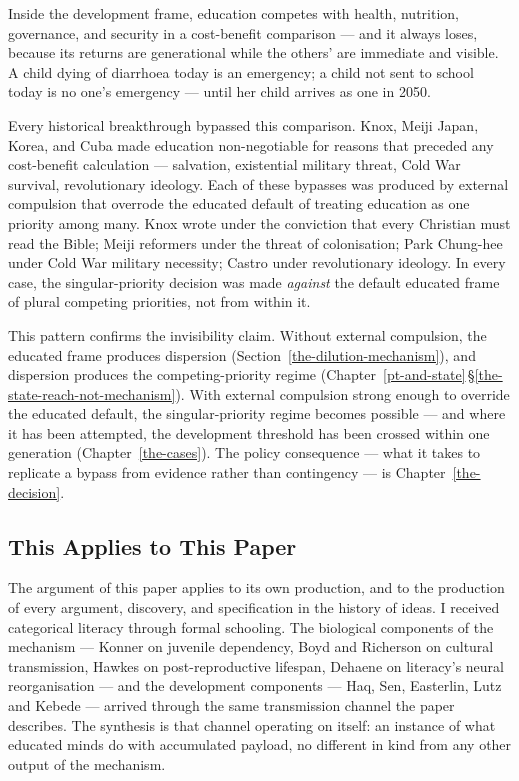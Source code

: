 \documentclass[12pt,letterpaper]{article}
\begin{document}
Inside the development frame, education competes with health,
nutrition, governance, and security in a cost-benefit comparison ---
and it always loses, because its returns are generational while the
others' are immediate and visible. A child dying of diarrhoea today is
an emergency; a child not sent to school today is no one's emergency
--- until her child arrives as one in 2050.

Every historical breakthrough bypassed this comparison. Knox, Meiji
Japan, Korea, and Cuba made education non-negotiable for reasons that
preceded any cost-benefit calculation --- salvation, existential
military threat, Cold War survival, revolutionary ideology. Each of
these bypasses was produced by external compulsion that overrode the
educated default of treating education as one priority among many.
Knox wrote under the conviction that every Christian must read the
Bible; Meiji reformers under the threat of colonisation; Park
Chung-hee under Cold War military necessity; Castro under
revolutionary ideology. In every case, the singular-priority decision
was made \emph{against} the default educated frame of plural
competing priorities, not from within it.

This pattern confirms the invisibility claim. Without external
compulsion, the educated frame produces dispersion (Section~\ref{the-dilution-mechanism}),
and dispersion produces the competing-priority regime
(Chapter~\ref{pt-and-state}\,\S\ref{the-state-reach-not-mechanism}).
With external compulsion strong enough to override the educated
default, the singular-priority regime becomes possible --- and where
it has been attempted, the development threshold has been crossed
within one generation (Chapter~\ref{the-cases}). The policy consequence
--- what it takes to replicate a bypass from evidence rather than
contingency --- is Chapter~\ref{the-decision}.

\subsection{This Applies to This Paper}\label{this-applies-to-this-paper}

The argument of this paper applies to its own production, and to the
production of every argument, discovery, and specification in the
history of ideas. I received categorical literacy through
formal schooling. The biological components of the mechanism --- Konner
on juvenile dependency, Boyd and Richerson on cultural transmission,
Hawkes on post-reproductive lifespan, Dehaene on literacy's neural
reorganisation --- and the development components --- Haq, Sen,
Easterlin, Lutz and Kebede --- arrived through the same transmission
channel the paper describes. The synthesis is that channel operating on
itself: an instance of what educated minds do with accumulated payload,
no different in kind from any other output of the mechanism.
\end{document}
